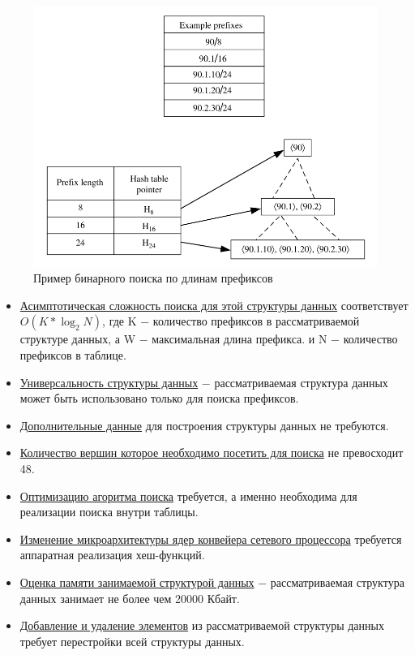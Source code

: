 \documentclass[a4peper, 12pt, titlepage, finall]{report}
\begin{document}
            \begin{figure}[h]
                \centering
                \includegraphics[width=\textwidth]{binary_search.png}
                \caption{Пример бинарного поиска по длинам префиксов}\label{fig:mesh4}
            \end{figure}

            \begin{itemize}
                \item\underline{Асимптотическая сложность поиска для этой структуры данных} соответствует {\ttfamily $O(K*\log_2{N})$},
                где {\ttfamily K} $-$ количество префиксов в рассматриваемой структуре данных, а {\ttfamily W} $-$ максимальная длина префикса.
                и {\ttfamily N} $-$ количество префиксов в таблице.
                \item\underline{Универсальность структуры данных} $-$ рассматриваемая структура данных может быть использовано только для поиска префиксов.
                \item\underline{Дополнительные данные} для построения структуры данных не требуются.
                \item\underline{Количество вершин которое необходимо посетить для поиска} не превосходит 48.
                \item\underline{Оптимизацию агоритма поиска} требуется, а именно необходима для реализации поиска внутри таблицы.
                \item\underline{Изменение микроархитектуры ядер конвейера сетевого процессора} требуется аппаратная реализация хеш-функций.
                \item\underline{Оценка памяти занимаемой структурой данных} $-$ рассматриваемая структура данных занимает не более чем 20000 Кбайт.
                \item\underline{Добавление и удаление элементов} из рассматриваемой структуры данных требует перестройки всей структуры данных.
            \end{itemize}
\end{document}
